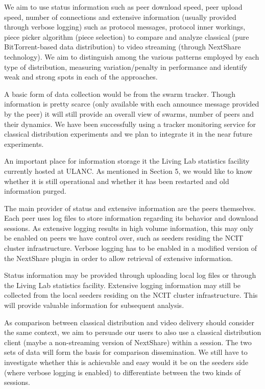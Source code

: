 We aim to use status information such as peer download speed, peer upload
speed, number of connections and extensive information (usually provided
through verbose logging) such as protocol messages, protocol inner workings,
piece picker algorithm (piece selection) to compare and analyze classical
(pure BitTorrent-based data distribution) to video streaming (through
NextShare technology). We aim to distinguish among the various patterns
employed by each type of distribution, measuring variation/penalty in
performance and identify weak and strong spots in each of the approaches.

A basic form of data collection would be from the swarm tracker. Though
information is pretty scarce (only available with each announce message
provided by the peer) it will still provide an overall view of swarms, number
of peers and their dynamics. We have been successfully using a tracker
monitoring service for classical distribution experiments and we plan to
integrate it in the near future experiments.

An important place for information storage it the Living Lab statistics
facility currently hosted at ULANC. As mentioned in Section 5, we would like
to know whether it is still operational and whether it has been restarted and
old information purged.

The main provider of status and extensive information are the peers
themselves. Each peer uses log files to store information regarding its
behavior and download sessions. As extensive logging results in high volume
information, this may only be enabled on peers we have control over, such as
seeders residing the NCIT cluster infrastructure. Verbose logging has to be
enabled in a modified version of the NextShare plugin in order to allow
retrieval of extensive information.

Status information may be provided through uploading local log files or
through the Living Lab statistics facility. Extensive logging information may
still be collected from the local seeders residing on the NCIT cluster
infrastructure. This will provide valuable information for subsequent
analysis.

As comparison between classical distribution and video delivery should
consider the same context, we aim to persuade our users to also use a
classical distribution client (maybe a non-streaming version of NextShare)
within a session. The two sets of data will form the basis for comparison
dissemination. We still have to investigate whether this is achievable and
easy would it be on the seeders side (where verbose logging is enabled) to
differentiate between the two kinds of sessions.

